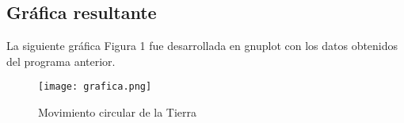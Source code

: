 \documentclass{article}
\begin{document}
\subsection{Gráfica resultante}
La siguiente gráfica Figura 1 fue desarrollada en gnuplot con los datos obtenidos del programa anterior.
\begin{figure}
    \texttt{[image: grafica.png]}
    \caption{Movimiento circular de la Tierra}
    \label{fig:Movimiento circular de la Tierra}
\end{figure}
\end{document}
